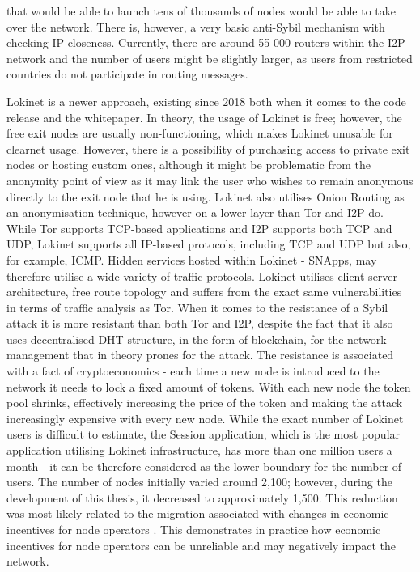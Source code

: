 that would be able to launch tens of thousands of nodes would be able to take over the network. There is, however, a very basic anti-Sybil mechanism with checking IP closeness. Currently, there are around 55 000 routers within the I2P network and the number of users might be slightly larger, as users from restricted countries do not participate in routing messages. 

Lokinet is a newer approach, existing since 2018 both when it comes to the code release and the whitepaper. In theory, the usage of Lokinet is free; however, the free exit nodes are usually non-functioning, which makes Lokinet unusable for clearnet usage. However, there is a possibility of purchasing access to private exit nodes or hosting custom ones, although it might be problematic from the anonymity point of view as it may link the user who wishes to remain anonymous directly to the exit node that he is using. Lokinet also utilises Onion Routing as an anonymisation technique, however on a lower layer than Tor and I2P do. While Tor supports TCP-based applications and I2P supports both TCP and UDP, Lokinet supports all IP-based protocols, including TCP and UDP but also, for example, ICMP. Hidden services hosted within Lokinet - SNApps, may therefore utilise a wide variety of traffic protocols. Lokinet utilises client-server architecture, free route topology and suffers from the exact same vulnerabilities in terms of traffic analysis as Tor. When it comes to the resistance of a Sybil attack it is more resistant than both Tor and I2P, despite the fact that it also uses decentralised DHT structure, in the form of blockchain, for the network management that in theory prones for the attack. The resistance is associated with a fact of cryptoeconomics - each time a new node is introduced to the network it needs to lock a fixed amount of tokens. With each new node the token pool shrinks, effectively increasing the price of the token and making the attack increasingly expensive with every new node. While the exact number of Lokinet users is difficult to estimate, the Session application, which is the most popular application utilising Lokinet infrastructure, has more than one million users a month - it can be therefore considered as the lower boundary for the number of users. The number of nodes initially varied around 2,100; however, during the development of this thesis, it decreased to approximately 1,500. This reduction was most likely related to the migration associated with changes in economic incentives for node operators \cite{session-migration}. This demonstrates in practice how economic incentives for node operators can be unreliable and may negatively impact the network.

